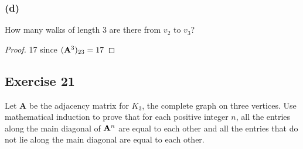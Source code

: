 \documentclass[14pt]{extarticle}
\begin{document}
\subsubsection{(d)}
How many walks of length 3 are there from \(v_2\) to \(v_3\)?
\begin{proof}
17 since \(({\bf A}^3)_{23} = 17\)
\end{proof}

\subsection{Exercise 21}
Let {\bf A} be the adjacency matrix for \(K_3\), the complete graph on three vertices. Use mathematical induction to prove 
that for each positive integer \(n\), all the entries along the main diagonal of \({\bf A}^n\) are equal to each other and 
all the entries that do not lie along the main diagonal are equal to each other.
\end{document}
